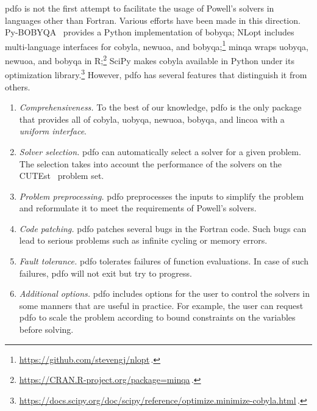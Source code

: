 \documentclass[
    smallextended,  %
    draft,          %
    final,          %
]{svjour3}
\begin{document}
\gls{pdfo} is not the first attempt to facilitate the usage of Powell's solvers in languages other than Fortran.
Various efforts have been made in this direction.
Py-BOBYQA~\cite{Cartis_Etal_2019,Cartis_Roberts_Sheridan-Methven_2022} provides a Python
implementation of \gls{bobyqa};
NLopt includes multi-language interfaces for \gls{cobyla}, \gls{newuoa}, and \gls{bobyqa};\footnote{\url{https://github.com/stevengj/nlopt}\,.}
minqa wraps \gls{uobyqa}, \gls{newuoa}, and \gls{bobyqa} in R;\footnote{\url{https://CRAN.R-project.org/package=minqa}\,.}
SciPy makes \gls{cobyla} available in Python under its optimization library.\footnote{\url{https://docs.scipy.org/doc/scipy/reference/optimize.minimize-cobyla.html}\,.}
However, \gls{pdfo} has several features that distinguish it from others.
\begin{enumerate}
    \item \emph{Comprehensiveness.}
    To the best of our knowledge, \gls{pdfo} is the only package that provides all of \gls{cobyla},
    \gls{uobyqa}, \gls{newuoa}, \gls{bobyqa}, and \gls{lincoa} with a \emph{uniform interface}.

    \item \emph{Solver selection.}
    \gls{pdfo} can automatically select a solver for a given problem.
    The selection takes into account the performance of the solvers on the
    CUTEst~\cite{Gould_Orban_Toint_2015} problem set.

    \item \emph{Problem preprocessing.}
    \gls{pdfo} preprocesses the inputs to simplify the problem and reformulate it to meet the requirements of Powell's solvers.

    \item \emph{Code patching.}
        \gls{pdfo} patches several bugs in the Fortran code.
        Such bugs can lead to serious problems such as infinite cycling or memory errors.

    \item \emph{Fault tolerance.}
        \gls{pdfo} tolerates failures of function evaluations.
    In case of such failures, \gls{pdfo} will not exit but try to progress.

    \item \emph{Additional options.}
    \gls{pdfo} includes options for the user to control the solvers in some manners that are useful in practice.
    For example, the user can request \gls{pdfo} to scale the problem according to bound constraints on the variables before solving.
\end{enumerate}
\end{document}
